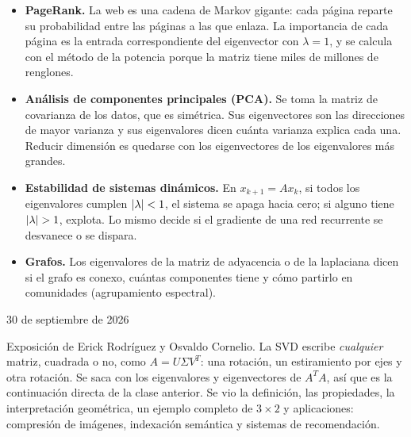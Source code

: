 \documentclass[11pt,letterpaper]{article}
\begin{document}
\begin{itemize}[itemsep=0.3em]
    \item \textbf{PageRank.} La web es una cadena de Markov gigante:
          cada página reparte su probabilidad entre las páginas a las
          que enlaza. La importancia de cada página es la entrada
          correspondiente del eigenvector con $\lambda = 1$, y se
          calcula con el método de la potencia porque la matriz tiene
          miles de millones de renglones.
    \item \textbf{Análisis de componentes principales (PCA).} Se toma
          la matriz de covarianza de los datos, que es simétrica. Sus
          eigenvectores son las direcciones de mayor varianza y sus
          eigenvalores dicen cuánta varianza explica cada una. Reducir
          dimensión es quedarse con los eigenvectores de los
          eigenvalores más grandes.
    \item \textbf{Estabilidad de sistemas dinámicos.} En
          $x_{k+1} = Ax_k$, si todos los eigenvalores cumplen
          $\left\lvert \lambda \right\rvert < 1$, el sistema se apaga hacia cero; si
          alguno tiene $\left\lvert \lambda \right\rvert > 1$, explota. Lo mismo decide si
          el gradiente de una red recurrente se desvanece o se dispara.
    \item \textbf{Grafos.} Los eigenvalores de la matriz de adyacencia
          o de la laplaciana dicen si el grafo es conexo, cuántas
          componentes tiene y cómo partirlo en comunidades
          (agrupamiento espectral).
\end{itemize}

\newpage


%
      {30 de septiembre de 2026}

\begin{quick_sum}
    Exposición de Erick Rodríguez y Osvaldo Cornelio. La SVD escribe
    \emph{cualquier} matriz, cuadrada o no, como $A = U \Sigma V^{T}$:
    una rotación, un estiramiento por ejes y otra rotación. Se saca
    con los eigenvalores y eigenvectores de $A^{T}A$, así que es la
    continuación directa de la clase anterior. Se vio la definición,
    las propiedades, la interpretación geométrica, un ejemplo completo
    de $3 \times 2$ y aplicaciones: compresión de imágenes,
    indexación semántica y sistemas de recomendación.
\end{quick_sum}
\end{document}
